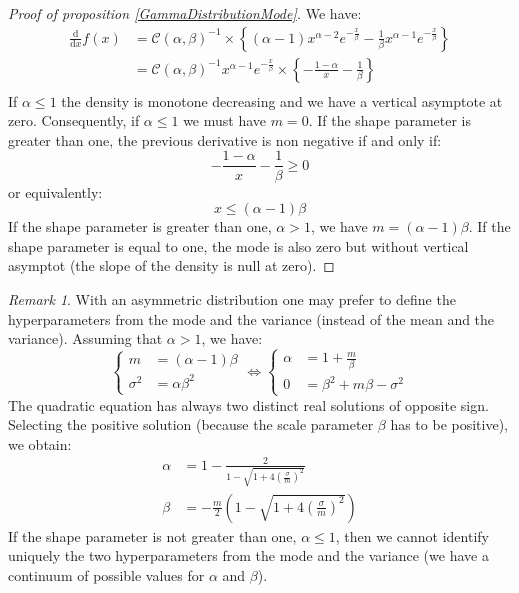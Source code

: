 \documentclass{amsart}
\theoremstyle{plain}
\theoremstyle{remark}
\newtheorem{remark}{Remark}[section]
\numberwithin{equation}{section}
\begin{document}
 \begin{proof}[Proof of proposition \ref{GammaDistributionMode}]
   We have:
   \[
     \begin{split}
     \frac{\mathrm d}{\mathrm dx} f(x) &= \mathcal{C}(\alpha,\beta)^{-1}
     \times
     \left\{
         (\alpha-1)x^{\alpha-2}e^{-\frac{x}{\beta}}-\frac{1}{\beta}x^{\alpha-1}e^{-\frac{x}{\beta}}
     \right\} \\
      &= \mathcal{C}(\alpha,\beta)^{-1} x^{\alpha-1}e^{-\frac{x}{\beta}}
      \times
      \left\{ -\frac{1-\alpha}{x}-\frac{1}{\beta} \right\} \\
     \end{split}
   \]
   If $\alpha\leq 1$ the density is monotone decreasing and we have a vertical asymptote at zero. Consequently, if $\alpha\leq 1$ we must have $m=0$. If the shape parameter is greater than one, the previous derivative is non negative if and only if:
   \[
     -\frac{1-\alpha}{x}-\frac{1}{\beta}\geq 0
   \]
   or equivalently:
   \[
     x \leq (\alpha-1)\beta
   \]
   If the shape parameter is greater than one, $\alpha>1$, we have $m=(\alpha-1)\beta$. If the shape parameter is equal to one, the mode is also zero but without vertical asymptot (the slope of the density is null at zero). 
 \end{proof}

 \begin{remark}
   With an asymmetric distribution one may prefer to define the hyperparameters from the mode and the variance (instead of the mean and the variance). Assuming that $\alpha>1$, we have:
   \[
     \begin{cases}
       m &= (\alpha-1)\beta\\
       \sigma^2 &= \alpha\beta^2
     \end{cases}
     \Leftrightarrow
     \begin{cases}
       \alpha &= 1+\frac{m}{\beta} \\
       0 &= \beta^2+m\beta-\sigma^2
     \end{cases}
   \]
   The quadratic equation has always two distinct real solutions of opposite sign. Selecting the positive solution (because the scale parameter $\beta$ has to be positive), we obtain:
   \[
     \begin{split}
       \alpha &= 1 - \frac{2}{1-\sqrt{1+4\left(\frac{\sigma}{m}\right)^2}}\\
       \beta &= -\frac{m}{2}\left(1-\sqrt{1+4\left(\frac{\sigma}{m}\right)^2}\right)
     \end{split}
   \]
   If the shape parameter is not greater than one, $\alpha\leq 1$, then we cannot identify uniquely the two hyperparameters from the mode and the variance (we have a continuum of possible values for $\alpha$ and $\beta$).
 \end{remark}
\end{document}
